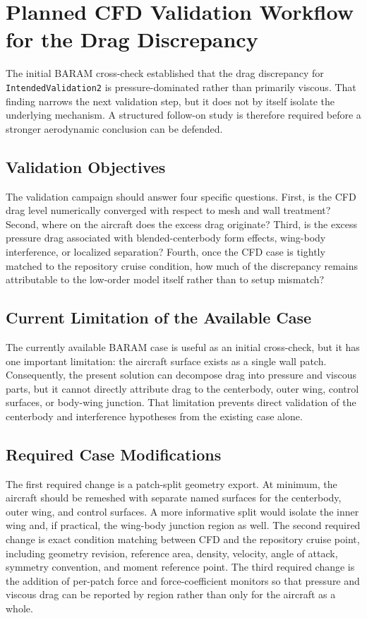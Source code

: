 \section{Planned CFD Validation Workflow for the Drag Discrepancy}
The initial BARAM cross-check established that the drag discrepancy for \texttt{IntendedValidation2} is pressure-dominated rather than primarily viscous. That finding narrows the next validation step, but it does not by itself isolate the underlying mechanism. A structured follow-on study is therefore required before a stronger aerodynamic conclusion can be defended.

\subsection{Validation Objectives}
The validation campaign should answer four specific questions. First, is the CFD drag level numerically converged with respect to mesh and wall treatment? Second, where on the aircraft does the excess drag originate? Third, is the excess pressure drag associated with blended-centerbody form effects, wing-body interference, or localized separation? Fourth, once the CFD case is tightly matched to the repository cruise condition, how much of the discrepancy remains attributable to the low-order model itself rather than to setup mismatch?

\subsection{Current Limitation of the Available Case}
The currently available BARAM case is useful as an initial cross-check, but it has one important limitation: the aircraft surface exists as a single wall patch. Consequently, the present solution can decompose drag into pressure and viscous parts, but it cannot directly attribute drag to the centerbody, outer wing, control surfaces, or body-wing junction. That limitation prevents direct validation of the centerbody and interference hypotheses from the existing case alone.

\subsection{Required Case Modifications}
The first required change is a patch-split geometry export. At minimum, the aircraft should be remeshed with separate named surfaces for the centerbody, outer wing, and control surfaces. A more informative split would isolate the inner wing and, if practical, the wing-body junction region as well. The second required change is exact condition matching between CFD and the repository cruise point, including geometry revision, reference area, density, velocity, angle of attack, symmetry convention, and moment reference point. The third required change is the addition of per-patch force and force-coefficient monitors so that pressure and viscous drag can be reported by region rather than only for the aircraft as a whole.

